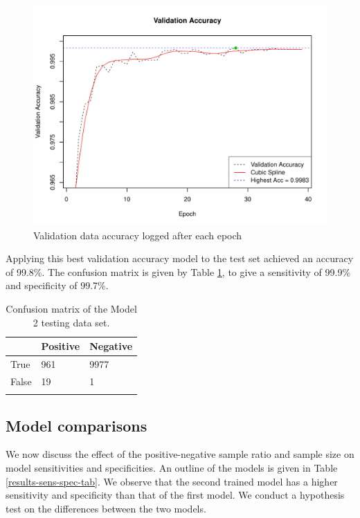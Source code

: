 \begin{figure}[ht]
	\centering
	\includegraphics[width=\textwidth]{Images/7_valid_acc5.pdf}
	\caption{Validation data accuracy logged after each epoch}
	\label{results-valid-acc5-fig}
\end{figure}

Applying this best validation accuracy model to the test set achieved an accuracy of 99.8\%. The confusion matrix is given by Table \ref{results-confmat5-tab}, to give a sensitivity of 99.9\% and specificity of 99.7\%.

\begin{table}[ht]
	\centering
	\begin{tabular}{@{}lll@{}}
	\toprule[1.5pt]
	& Positive & Negative\\
	\midrule
	True & 961 & 9977\\
	False & 19 & 1\\
	\bottomrule[1.5pt]\\
	\end{tabular}
	\caption{Confusion matrix of the Model 2 testing data set.}
	\label{results-confmat5-tab}
\end{table}

\subsection*{Model comparisons}

We now discuss the effect of the positive-negative sample ratio and sample size on model sensitivities and specificities. An outline of the models is given in Table \ref{results-sens-spec-tab}. We observe that the second trained model has a higher sensitivity and specificity than that of the first model. We conduct a hypothesis test on the differences between the two models.

